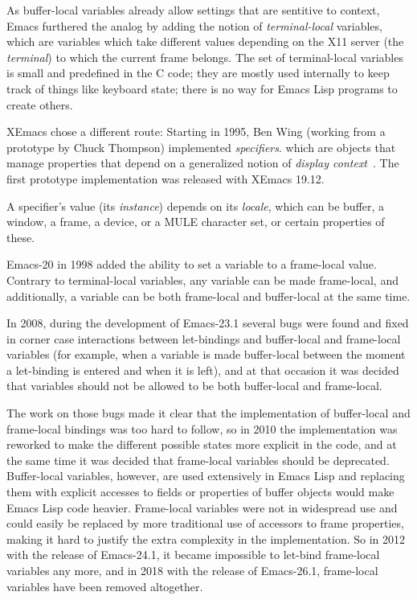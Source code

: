 \documentclass[format=acmsmall, review]{acmart}
\newcommand \Elisp {Emacs Lisp}
\begin{document}
As buffer-local variables already allow settings that are sentitive to
context, Emacs furthered the analog by adding the notion of
\emph{terminal-local} variables, which are variables which take
different values depending on the X11 server (the \emph{terminal}) to
which the current frame belongs.  The set of terminal-local variables
is small and predefined in the C code; they are mostly used internally
to keep track of things like keyboard state; there is no way for
\Elisp{} programs to create others.

XEmacs chose a different route: Starting in 1995, Ben Wing (working
from a prototype by Chuck Thompson) implemented
\emph{specifiers}. which are objects that manage properties that
depend on a generalized notion of \emph{display
  context}~\cite{XEmacsLispRef1998}.  The first prototype
implementation was released with XEmacs 19.12.

A specifier's value (its \emph{instance}) depends on its
\emph{locale}, which can be buffer, a window, a frame, a device, or a MULE
character set, or certain properties of these.

Emacs-20 in 1998 added the ability to set a variable to a frame-local
value.  Contrary to terminal-local variables, any variable can be made
frame-local, and additionally, a variable can be both frame-local and
buffer-local at the same time.

In 2008, during the development of Emacs-23.1 several bugs were found and
fixed in corner case interactions between let-bindings and buffer-local and
frame-local variables (for example, when a variable is made buffer-local
between the moment a let-binding is entered and when it is left), and at
that occasion it was decided that variables should not be allowed to be both
buffer-local and frame-local.

The work on those bugs made it clear that the implementation of buffer-local
and frame-local bindings was too hard to follow, so in 2010 the
implementation was reworked to make the different possible states more
explicit in the code, and at the same time it was decided that frame-local
variables should be deprecated.  Buffer-local variables, however, are used
extensively in \Elisp{} and replacing them with explicit accesses to fields
or properties of buffer objects would make \Elisp{} code heavier.
Frame-local variables were not in widespread use and could easily be
replaced by more traditional use of accessors to frame properties, making it
hard to justify the extra complexity in the implementation.  So in 2012 with
the release of Emacs-24.1, it became impossible to let-bind frame-local
variables any more, and in 2018 with the release of Emacs-26.1, frame-local
variables have been removed altogether.
\end{document}
